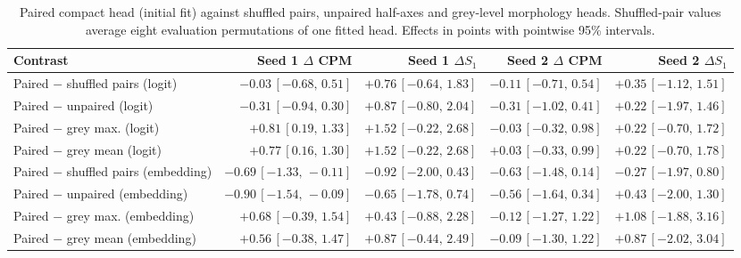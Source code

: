 \begin{table}[!t]
\centering
\footnotesize\setlength{\tabcolsep}{4pt}
\caption{Paired compact head (initial fit) against shuffled pairs, unpaired half-axes and grey-level morphology heads. Shuffled-pair values average eight evaluation permutations of one fitted head. Effects in points with pointwise 95\% intervals.}
\label{tab:locked_compact}
\begin{tabular}{@{}lrrrr@{}}
\toprule
Contrast & Seed 1 $\Delta$ CPM & Seed 1 $\Delta S_1$ & Seed 2 $\Delta$ CPM & Seed 2 $\Delta S_1$ \\
\midrule
Paired $-$ shuffled pairs (logit) & $-0.03\,[-0.68,\,0.51]$ & $+0.76\,[-0.64,\,1.83]$ & $-0.11\,[-0.71,\,0.54]$ & $+0.35\,[-1.12,\,1.51]$ \\
Paired $-$ unpaired (logit) & $-0.31\,[-0.94,\,0.30]$ & $+0.87\,[-0.80,\,2.04]$ & $-0.31\,[-1.02,\,0.41]$ & $+0.22\,[-1.97,\,1.46]$ \\
Paired $-$ grey max. (logit) & $+0.81\,[0.19,\,1.33]$ & $+1.52\,[-0.22,\,2.68]$ & $-0.03\,[-0.32,\,0.98]$ & $+0.22\,[-0.70,\,1.72]$ \\
Paired $-$ grey mean (logit) & $+0.77\,[0.16,\,1.30]$ & $+1.52\,[-0.22,\,2.68]$ & $+0.03\,[-0.33,\,0.99]$ & $+0.22\,[-0.70,\,1.78]$ \\
Paired $-$ shuffled pairs (embedding) & $-0.69\,[-1.33,\,-0.11]$ & $-0.92\,[-2.00,\,0.43]$ & $-0.63\,[-1.48,\,0.14]$ & $-0.27\,[-1.97,\,0.80]$ \\
Paired $-$ unpaired (embedding) & $-0.90\,[-1.54,\,-0.09]$ & $-0.65\,[-1.78,\,0.74]$ & $-0.56\,[-1.64,\,0.34]$ & $+0.43\,[-2.00,\,1.30]$ \\
Paired $-$ grey max. (embedding) & $+0.68\,[-0.39,\,1.54]$ & $+0.43\,[-0.88,\,2.28]$ & $-0.12\,[-1.27,\,1.22]$ & $+1.08\,[-1.88,\,3.16]$ \\
Paired $-$ grey mean (embedding) & $+0.56\,[-0.38,\,1.47]$ & $+0.87\,[-0.44,\,2.49]$ & $-0.09\,[-1.30,\,1.22]$ & $+0.87\,[-2.02,\,3.04]$ \\
\bottomrule
\end{tabular}
\end{table}
